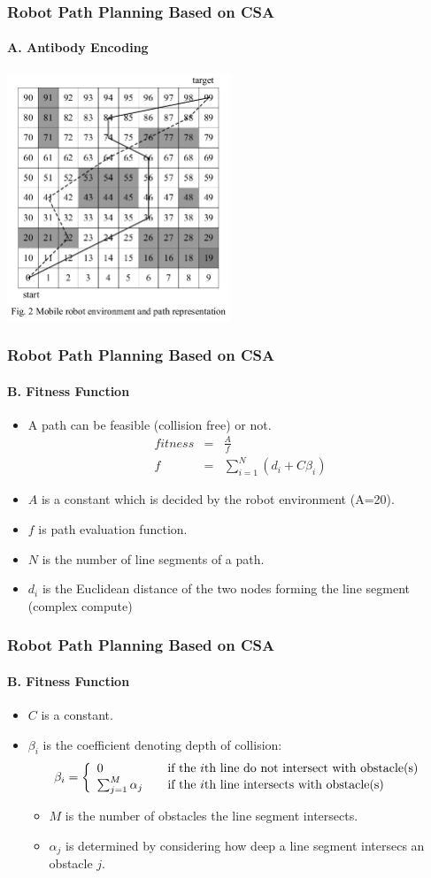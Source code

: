 \frame
{
\frametitle{Robot Path Planning Based on CSA}
\framesubtitle{A. Antibody Encoding}
\begin{center}
	\includegraphics[width=0.5\textwidth]{img/diagram1}
\end{center}
}

\frame
{
\frametitle{Robot Path Planning Based on CSA}
\framesubtitle{B. Fitness Function}
\begin{itemize}
	\item A path can be feasible (collision free) or not.
	\begin{eqnarray}
		fitness &=& \frac{A}{f} \nonumber \\
		f &=& \sum_{i=1}^{N}(d_{i} + C\beta_{i}) \nonumber
	\end{eqnarray}
	\item $A$ is a constant which is decided by the robot environment (A=20).
	\item $f$ is path evaluation function.
	\item $N$ is the number of line segments of a path.
	\item $d_{i}$ is the Euclidean distance of the two nodes forming the line segment (complex compute)
\end{itemize}
}
\frame
{
\frametitle{Robot Path Planning Based on CSA}
\framesubtitle{B. Fitness Function}
\begin{itemize}
	\item $C$ is a constant.
	\item $\beta_{i}$ is the coefficient denoting depth of collision:
	\[
	\beta_{i} = \left\{ 
		\begin{array}{l l}
	    0                         & \quad \text{if the $i$th line do not intersect with obstacle(s)}\\
	    \sum_{j=1}^{M} \alpha_{j} & \quad \text{if the $i$th line intersects with obstacle(s) }\\
		\end{array} \right.
	\]
	\begin{itemize}
		\item $M$ is the number of obstacles the line segment intersects.
		\item $\alpha_{j}$ is determined by considering how deep a line segment intersecs an obstacle $j$. 
	\end{itemize}
\end{itemize}
}

